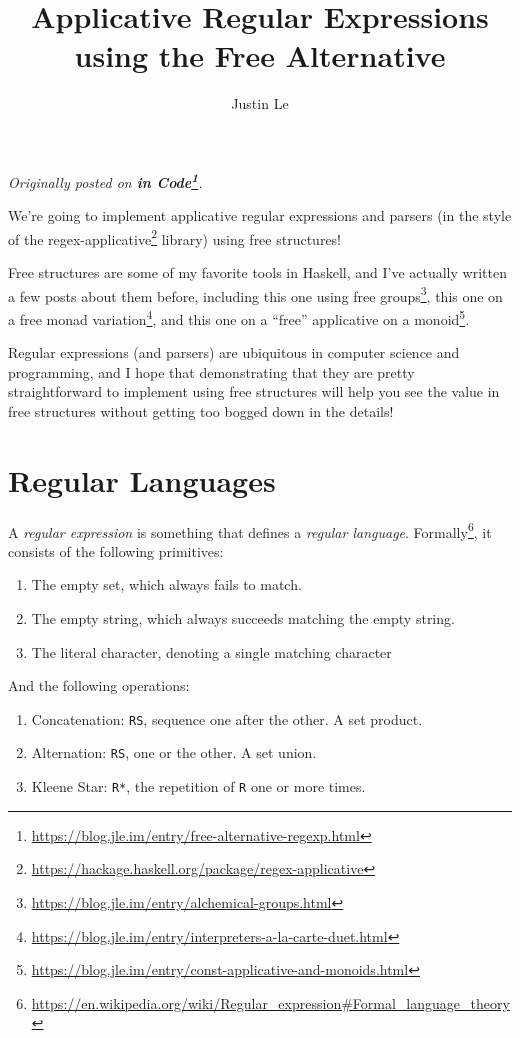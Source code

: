 \documentclass[]{article}
\title{Applicative Regular Expressions using the Free Alternative}
\author{Justin Le}
\renewcommand{\href}[2]{#2\footnote{\url{#1}}}
\begin{document}
\maketitle

\emph{Originally posted on
\textbf{\href{https://blog.jle.im/entry/free-alternative-regexp.html}{in
Code}}.}

We're going to implement applicative regular expressions and parsers (in the
style of the
\href{https://hackage.haskell.org/package/regex-applicative}{regex-applicative}
library) using free structures!

Free structures are some of my favorite tools in Haskell, and I've actually
written a few posts about them before, including
\href{https://blog.jle.im/entry/alchemical-groups.html}{this one using free
groups}, \href{https://blog.jle.im/entry/interpreters-a-la-carte-duet.html}{this
one on a free monad variation}, and
\href{https://blog.jle.im/entry/const-applicative-and-monoids.html}{this one on
a ``free'' applicative on a monoid}.

Regular expressions (and parsers) are ubiquitous in computer science and
programming, and I hope that demonstrating that they are pretty straightforward
to implement using free structures will help you see the value in free
structures without getting too bogged down in the details!

\hypertarget{regular-languages}{%
\section{Regular Languages}\label{regular-languages}}

A \emph{regular expression} is something that defines a \emph{regular language}.
\href{https://en.wikipedia.org/wiki/Regular_expression\#Formal_language_theory}{Formally},
it consists of the following primitives:

\begin{enumerate}
\def\labelenumi{\arabic{enumi}.}
\tightlist
\item
  The empty set, which always fails to match.
\item
  The empty string, which always succeeds matching the empty string.
\item
  The literal character, denoting a single matching character
\end{enumerate}

And the following operations:

\begin{enumerate}
\def\labelenumi{\arabic{enumi}.}
\tightlist
\item
  Concatenation: \texttt{RS}, sequence one after the other. A set product.
\item
  Alternation: \texttt{R\textbar{}S}, one or the other. A set union.
\item
  Kleene Star: \texttt{R*}, the repetition of \texttt{R} one or more times.
\end{enumerate}
\end{document}
